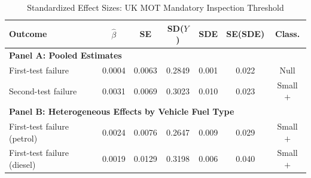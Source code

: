 \begin{table}[htbp]
\centering
\caption{Standardized Effect Sizes: UK MOT Mandatory Inspection Threshold}\label{tab:sde}
\begin{threeparttable}
\small
\begin{tabular}{lcccccc}
\toprule
Outcome & $\hat{\beta}$ & SE & SD($Y$) & SDE & SE(SDE) & Class. \\
\midrule
\multicolumn{7}{l}{\textbf{Panel A: Pooled Estimates}} \\
\midrule
First-test failure & 0.0004 & 0.0063 & 0.2849 & 0.001 & 0.022 & Null \\
Second-test failure & 0.0031 & 0.0069 & 0.3023 & 0.010 & 0.023 & Small $+$ \\
\midrule
\multicolumn{7}{l}{\textbf{Panel B: Heterogeneous Effects by Vehicle Fuel Type}} \\
\midrule
First-test failure (petrol) & 0.0024 & 0.0076 & 0.2647 & 0.009 & 0.029 & Small $+$ \\
First-test failure (diesel) & 0.0019 & 0.0129 & 0.3198 & 0.006 & 0.040 & Small $+$ \\
\bottomrule
\end{tabular}
\begin{tablenotes}

\end{tablenotes}
\end{threeparttable}
\end{table}
